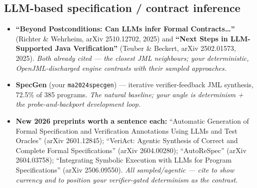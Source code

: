 \documentclass[11pt]{article}
\begin{document}
\subsection{LLM-based specification / contract inference}
\begin{itemize}[leftmargin=1.4em,itemsep=0.1em]
  \item \textbf{``Beyond Postconditions: Can LLMs infer Formal Contracts\dots''}
        (Richter \& Wehrheim, arXiv 2510.12702, 2025) and \textbf{``Next Steps
        in LLM-Supported Java Verification''} (Teuber \& Beckert,
        arXiv 2502.01573, 2025). \emph{Both already cited --- the closest JML
        neighbours; your deterministic, OpenJML-discharged engine contrasts
        with their sampled approaches.}
  \item \textbf{SpecGen} (your \texttt{ma2024specgen}) --- iterative
        verifier-feedback JML synthesis, 72.5\% of 385 programs.
        \emph{The natural baseline; your angle is determinism + the
        probe-and-backport development loop.}
  \item \textbf{New 2026 preprints worth a sentence each:} ``Automatic
        Generation of Formal Specification and Verification Annotations Using
        LLMs and Test Oracles'' (arXiv 2601.12845); ``VeriAct: Agentic
        Synthesis of Correct and Complete Formal Specifications''
        (arXiv 2604.00280); ``AutoReSpec'' (arXiv 2604.03758); ``Integrating
        Symbolic Execution with LLMs for Program Specifications''
        (arXiv 2506.09550). \emph{All sampled/agentic --- cite to show currency
        and to position your verifier-gated determinism as the contrast.}
\end{itemize}
\end{document}
